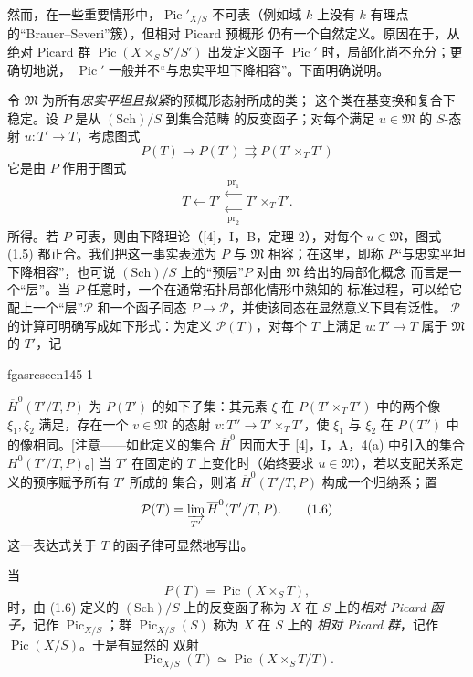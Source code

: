 \documentclass[12pt,twoside,openany]{book}
\numberwithin{equation}{section}
\newcommand{\fgaunitid}{unbound}
\newcommand{\src}[1]{%
  \phantomsection
  \hypertarget{src:\fgaunitid:#1}{}%
  \hypertarget{fga.\fgaunitid.p#1}{}%
  \ifcsname fgasrcseen#1\endcsname\else
    \expandafter\gdef\csname fgasrcseen#1\endcsname{1}%
    \hypertarget{src:#1}{}%
  \fi
  \marginpar{\raggedleft\footnotesize\sffamily #1}%
}
\theoremstyle{plain}
\theoremstyle{definition}
\theoremstyle{remark}
\begin{document}
然而，在一些重要情形中，$\operatorname{Pic}'_{X/S}$ 不可表（例如域
$k$ 上没有 $k$-有理点的“Brauer--Severi”簇），但相对 Picard 预概形
仍有一个自然定义。原因在于，从绝对 Picard 群
$\operatorname{Pic}(X\times_S S'/S')$ 出发定义函子
$\operatorname{Pic}'$ 时，局部化尚不充分；更确切地说，
$\operatorname{Pic}'$ 一般并不“与忠实平坦下降相容”。下面明确说明。

令 $\mathfrak M$ 为所有\emph{忠实平坦且拟紧}的预概形态射所成的类；
这个类在基变换和复合下稳定。设 $P$ 是从 $(\mathrm{Sch})/S$ 到集合范畴
的反变函子；对每个满足 $u\in\mathfrak M$ 的 $S$-态射
$u:T'\longrightarrow T$，考虑图式
\begin{equation}
P(T)\longrightarrow P(T')\rightrightarrows P(T'\times_TT')
\tag{1.5}
\end{equation}
它是由 $P$ 作用于图式
\[
T\longleftarrow T'\mathrel{\substack{\xleftarrow{\,\mathrm{pr}_1\,}\\[-0.35ex]
\xleftarrow[\,\mathrm{pr}_2\,]{}}}T'\times_TT'.
\]
所得。若 $P$ 可表，则由下降理论（[4]，I，B，定理 2），对每个
$u\in\mathfrak M$，图式 (1.5) 都正合。我们把这一事实表述为 $P$ 与
$\mathfrak M$ 相容；在这里，即称 $P$“与忠实平坦下降相容”，也可说
$(\mathrm{Sch})/S$ 上的“预层”$P$ 对由 $\mathfrak M$ 给出的局部化概念
而言是一个“层”。当 $P$ 任意时，一个在通常拓扑局部化情形中熟知的
标准过程，可以给它配上一个“层”$\mathcal P$ 和一个函子同态
$P\longrightarrow\mathcal P$，并使该同态在显然意义下具有泛性。
$\mathcal P$ 的计算可明确写成如下形式：为定义 $\mathcal P(T)$，对每个
$T$ 上满足 $u:T'\longrightarrow T$ 属于 $\mathfrak M$ 的 $T'$，记

\src{145}
$\overline H^0(T'/T,P)$ 为 $P(T')$ 的如下子集：其元素 $\xi$ 在
$P(T'\times_TT')$ 中的两个像 $\xi_1,\xi_2$ 满足，存在一个
$v\in\mathfrak M$ 的态射 $v:T''\longrightarrow T'\times_TT'$，使
$\xi_1$ 与 $\xi_2$ 在 $P(T'')$ 中的像相同。[注意——如此定义的集合
$\overline H^0$ 因而大于 [4]，I，A，4(a) 中引入的集合
$H^0(T'/T,P)$。] 当 $T'$ 在固定的 $T$ 上变化时（始终要求
$u\in\mathfrak M$），若以支配关系定义的预序赋予所有 $T'$ 所成的
集合，则诸 $\overline H^0(T'/T,P)$ 构成一个归纳系；置
\begin{equation}
\mathcal P(T)=\varinjlim_{T'}\overline H^0(T'/T,P).
\tag{1.6}
\end{equation}
这一表达式关于 $T$ 的函子律可显然地写出。

当
\[
P(T)=\operatorname{Pic}(X\times_ST),
\]
时，由 (1.6) 定义的 $(\mathrm{Sch})/S$ 上的反变函子称为 $X$ 在 $S$
上的\emph{相对 Picard 函子}，记作 $\operatorname{Pic}_{X/S}$；群
$\operatorname{Pic}_{X/S}(S)$ 称为 $X$ 在 $S$ 上的
\emph{相对 Picard 群}，记作 $\operatorname{Pic}(X/S)$。于是有显然的
双射
\begin{equation}
\operatorname{Pic}_{X/S}(T)\simeq\operatorname{Pic}(X\times_ST/T).
\tag{1.7}
\end{equation}
\end{document}
